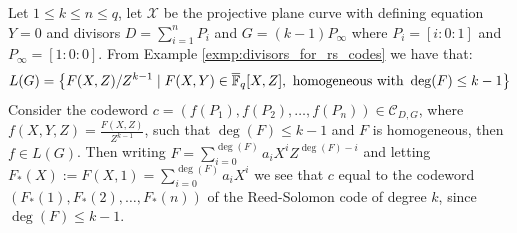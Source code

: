 \begin{example}\label{exmp:rs_is_goppa}
  Let $1 \leq k \leq n \leq q$, let $\mathcal{X}$ be the projective plane curve with defining equation $Y = 0$ and divisors $D = \sum_{i = 1}^{n}P_{i}$ and $G = (k - 1)P_{\infty}$ where $P_{i} = [i : 0 : 1]$ and $P_{\infty} = [1 : 0 : 0]$. From Example \ref{exmp:divisors_for_rs_codes} we have that:
  \begin{equation*}
    L(G) = \left\{F(X, Z) / Z^{k -1} \mid F(X, Y) \in \overline{\mathbb{F}}_{q}[X, Z], \text{ homogeneous with } \deg(F) \leq k - 1\right\}
  \end{equation*}
  Consider the codeword $c = (f(P_{1}), f(P_2), \ldots, f(P_{n})) \in \mathcal{C}_{D, G}$, where $f(X, Y, Z) = \frac{F(X, Z)}{Z^{k - 1}}$, such that $\deg(F) \leq k - 1$ and $F$ is homogeneous, then $f \in L(G)$. Then writing $F = \sum_{i = 0}^{\deg(F)} a_{i}X^{i} Z^{\deg(F) - i}$ and letting $F_{*}(X) := F(X, 1) = \sum_{i = 0}^{\deg(F)} a_{i} X^{i}$ we see that $c$ equal to the codeword $(F_{*}(1), F_{*}(2), \ldots, F_{*}(n))$ of the Reed-Solomon code of degree $k$, since $\deg(F) \leq k - 1$.
\end{example}

